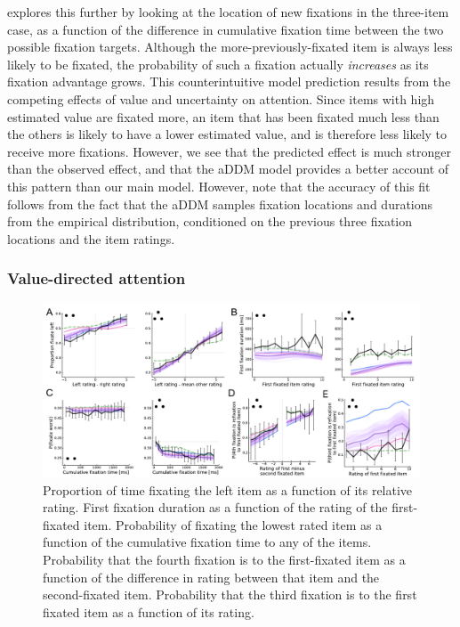  explores this further by looking at the location of new fixations in the three-item case, as a function of the difference in cumulative fixation time between the two possible fixation targets. Although the more-previously-fixated item is always less likely to be fixated, the probability of such a fixation actually \emph{increases} as its fixation advantage grows. This counterintuitive model prediction results from the competing effects of value and uncertainty on attention. Since items with high estimated value are fixated more, an item that has been fixated much less than the others is likely to have a lower estimated value, and is therefore less likely to receive more fixations. However, we see that the predicted effect is much stronger than the observed effect, and that the aDDM model provides a better account of this pattern than our main model. However, note that the accuracy of this fit follows from the fact that the aDDM samples fixation locations and durations from the empirical distribution, conditioned on the previous three fixation locations and the item ratings. 


\subsubsection{Value-directed attention}

\begin{figure}[t!]
  \centering
  \includegraphics[width=\textwidth]{figs/attention/Fig6.pdf}
  \caption{
   Proportion of time fixating the left item as a function of its relative rating.
   First fixation duration as a function of the rating of the first-fixated item.
   Probability of fixating the lowest rated item as a function of the cumulative fixation time to any of the items.
   Probability that the fourth fixation is to the first-fixated item as a function of the difference in rating between that item and the second-fixated item.
   Probability that the third fixation is to the first fixated item as a function of its rating.
  }
  \label{fig:attention6}
\end{figure}

